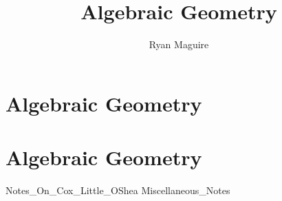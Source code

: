 \documentclass[crop=false,class=book,oneside]{standalone}
\begin{document}
    \newif\ifmathcoursesalgebraicgeometry
    \ifx\ifmathcourses\undefined
        \title{Algebraic Geometry}
        \author{Ryan Maguire}
        \date{\vspace{-5ex}}
        \maketitle
        \tableofcontents
        \chapter*{Algebraic Geometry}
        \setcounter{chapter}{1}
    \else
        \chapter{Algebraic Geometry}
    \fi
    {Notes_On_Cox_Little_OShea}
    {Miscellaneous_Notes}
\end{document}
